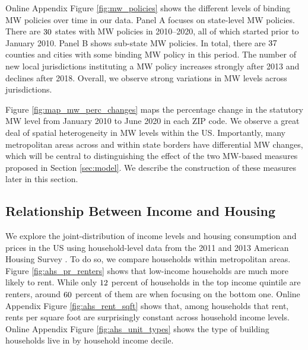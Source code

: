 Online Appendix Figure \ref{fig:mw_policies} shows the different levels of 
binding MW policies over time in our data.
Panel A focuses on state-level MW policies.
There are $\textnormal{30}$ states with MW policies in 2010--2020, all of 
which started prior to January 2010.
Panel B shows sub-state MW policies.
In total, there are $\textnormal{37}$ counties and cities with some binding MW
policy in this period.
The number of new local jurisdictions instituting a MW policy increases strongly 
after 2013 and declines after 2018.
Overall, we observe strong variations in MW levels across jurisdictions.

Figure \ref{fig:map_mw_perc_changes} maps the percentage change in 
the statutory MW level from January 2010 to June 2020 in each ZIP code.
We observe a great deal of spatial heterogeneity in MW levels within the US.
Importantly, many metropolitan areas across and within state borders have 
differential MW changes, which will be central to distinguishing the effect 
of the two MW-based measures proposed in Section \ref{sec:model}.
We describe the construction of these measures later in this section.

\subsection{Relationship Between Income and Housing}
\label{sec:data_income_housing}

We explore the joint-distribution of income levels and housing consumption and
prices in the US using household-level data from the 2011 and 2013 
American Housing Survey \parencite{ahs2020}.
To do so, we compare households within metropolitan areas.
Figure \ref{fig:ahs_pr_renters} shows that low-income households are much
more likely to rent.
While only $\textnormal{12}$ percent of households in the top income quintile 
are renters, around $\textnormal{60}$ percent of them are when focusing on 
the bottom one.
Online Appendix Figure \ref{fig:ahs_rent_sqft} shows that, among households 
that rent, rents per square foot are surprisingly constant across household 
income levels.
Online Appendix Figure \ref{fig:ahs_unit_types} shows the type of building 
households live in by household income decile.


